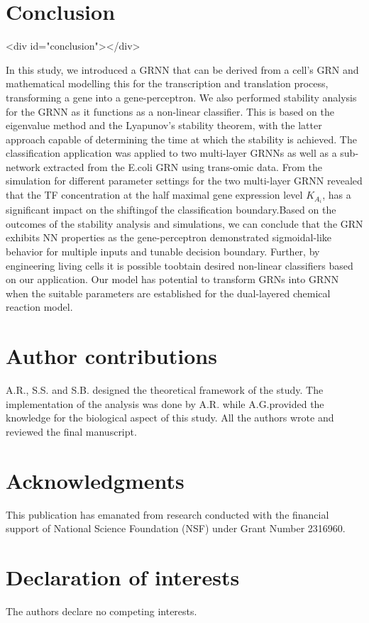\documentclass[twocolumn]{biophys-new}
\begin{document}
{{\section{Conclusion} <div id="conclusion"></div>

In this study, we introduced a GRNN that can be derived from a cell's GRN and mathematical modelling this for the transcription and translation process, transforming a gene into a gene-perceptron. We also performed stability analysis for the GRNN as it functions as a non-linear classifier. This is based on the eigenvalue method and the Lyapunov's stability theorem, with the latter approach capable of determining the time at which the stability is achieved. 
The classification application was applied to two multi-layer GRNNs as well as a sub-network extracted from the E.coli GRN using trans-omic data. 
From the simulation for different parameter settings for the two multi-layer GRNN revealed that the TF concentration at the half maximal gene expression level $K_{A_i}$, has a significant impact on the shiftingof the classification boundary.Based on the outcomes of the stability analysis and simulations, we can conclude that the GRN exhibits NN properties as the gene-perceptron demonstrated sigmoidal-like behavior for multiple inputs and tunable decision boundary. Further, by engineering living cells it is possible toobtain desired non-linear classifiers based on our application. 
Our model has potential to transform GRNs into GRNN when the suitable parameters are established for the dual-layered chemical
reaction model. 




\section{Author contributions}
A.R., S.S. and S.B. designed the theoretical framework of the study. The implementation of the analysis was done by A.R. while A.G.provided the knowledge for the biological aspect of this study. All the authors wrote and reviewed the final manuscript.

\section{Acknowledgments}
This publication has emanated from research conducted with the financial support of National Science Foundation (NSF) under Grant Number 2316960.

\section{Declaration of interests}
The authors declare no competing interests.

}}
\end{document}
